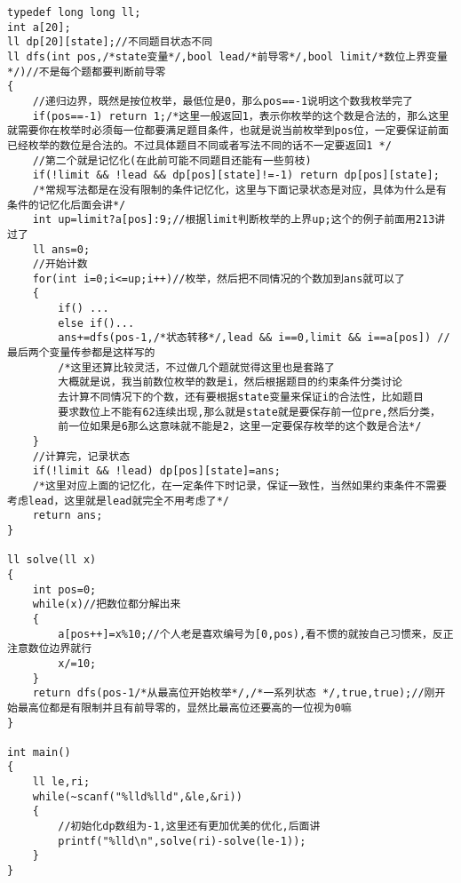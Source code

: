 \begin{lstlisting}
typedef long long ll;
int a[20];
ll dp[20][state];//不同题目状态不同
ll dfs(int pos,/*state变量*/,bool lead/*前导零*/,bool limit/*数位上界变量*/)//不是每个题都要判断前导零
{
	//递归边界，既然是按位枚举，最低位是0，那么pos==-1说明这个数我枚举完了
	if(pos==-1) return 1;/*这里一般返回1，表示你枚举的这个数是合法的，那么这里就需要你在枚举时必须每一位都要满足题目条件，也就是说当前枚举到pos位，一定要保证前面已经枚举的数位是合法的。不过具体题目不同或者写法不同的话不一定要返回1 */
	//第二个就是记忆化(在此前可能不同题目还能有一些剪枝)
	if(!limit && !lead && dp[pos][state]!=-1) return dp[pos][state];
	/*常规写法都是在没有限制的条件记忆化，这里与下面记录状态是对应，具体为什么是有条件的记忆化后面会讲*/
	int up=limit?a[pos]:9;//根据limit判断枚举的上界up;这个的例子前面用213讲过了
	ll ans=0;
	//开始计数
	for(int i=0;i<=up;i++)//枚举，然后把不同情况的个数加到ans就可以了
	{
		if() ...
		else if()...
		ans+=dfs(pos-1,/*状态转移*/,lead && i==0,limit && i==a[pos]) //最后两个变量传参都是这样写的
		/*这里还算比较灵活，不过做几个题就觉得这里也是套路了
		大概就是说，我当前数位枚举的数是i，然后根据题目的约束条件分类讨论
		去计算不同情况下的个数，还有要根据state变量来保证i的合法性，比如题目
		要求数位上不能有62连续出现,那么就是state就是要保存前一位pre,然后分类，
		前一位如果是6那么这意味就不能是2，这里一定要保存枚举的这个数是合法*/
	}
	//计算完，记录状态
	if(!limit && !lead) dp[pos][state]=ans;
	/*这里对应上面的记忆化，在一定条件下时记录，保证一致性，当然如果约束条件不需要考虑lead，这里就是lead就完全不用考虑了*/
	return ans;
}

ll solve(ll x)
{
	int pos=0;
	while(x)//把数位都分解出来
	{
		a[pos++]=x%10;//个人老是喜欢编号为[0,pos),看不惯的就按自己习惯来，反正注意数位边界就行
		x/=10;
	}
	return dfs(pos-1/*从最高位开始枚举*/,/*一系列状态 */,true,true);//刚开始最高位都是有限制并且有前导零的，显然比最高位还要高的一位视为0嘛
}

int main()
{
	ll le,ri;
	while(~scanf("%lld%lld",&le,&ri))
	{
		//初始化dp数组为-1,这里还有更加优美的优化,后面讲
		printf("%lld\n",solve(ri)-solve(le-1));
	}
}
\end{lstlisting}